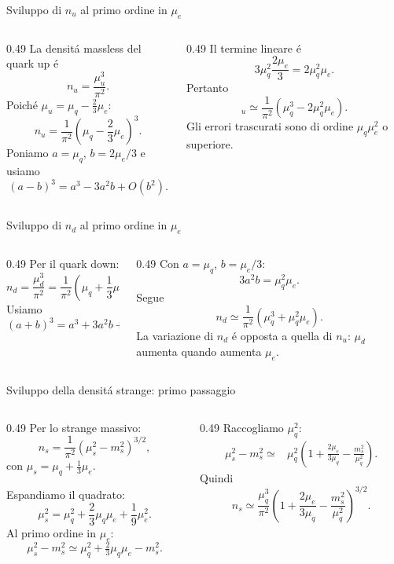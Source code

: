 \begin{frame}[t]{Sviluppo di $n_u$ al primo ordine in $\mu_e$}
\small
\begin{columns}[T,onlytextwidth]
\begin{column}{0.49\textwidth}
La densit\'a massless del quark up \'e
\[
n_u=\frac{\mu_u^3}{\pi^2}.
\]
Poich\'e $\mu_u=\mu_q-\frac23\mu_e$:
\[
 n_u=\frac1{\pi^2}
\left(\mu_q-\frac23\mu_e\right)^3.
\]
Poniamo $a=\mu_q$, $b=2\mu_e/3$ e usiamo
\[
(a-b)^3=a^3-3a^2b+O(b^2).
\]
\end{column}
\begin{column}{0.49\textwidth}
Il termine lineare \'e
\[
3\mu_q^2\frac{2\mu_e}{3}
=2\mu_q^2\mu_e.
\]
Pertanto
\[
\boxed{
_u\simeq\frac1{\pi^2}
\left(\mu_q^3-2\mu_q^2\mu_e\right)}.
\]
Gli errori trascurati sono di ordine $\mu_q\mu_e^2$ o superiore.
\end{column}
\end{columns}
\end{frame}

\begin{frame}[t]{Sviluppo di $n_d$ al primo ordine in $\mu_e$}
\small
\begin{columns}[T,onlytextwidth]
\begin{column}{0.49\textwidth}
Per il quark down:
\[
n_d=\frac{\mu_d^3}{\pi^2}
=\frac1{\pi^2}
\left(\mu_q+\frac13\mu_e\right)^3.
\]
Usiamo
\[
(a+b)^3=a^3+3a^2b+O(b^2).
\]
\end{column}
\begin{column}{0.49\textwidth}
Con $a=\mu_q$, $b=\mu_e/3$:
\[
3a^2b=\mu_q^2\mu_e.
\]
Segue
\[
\boxed{
n_d\simeq\frac1{\pi^2}
\left(\mu_q^3+\mu_q^2\mu_e\right)}.
\]
La variazione di $n_d$ \'e opposta a quella di $n_u$: $\mu_d$ aumenta quando aumenta $\mu_e$.
\end{column}
\end{columns}
\end{frame}

\begin{frame}[t]{Sviluppo della densit\'a strange: primo passaggio}
\small
\begin{columns}[T,onlytextwidth]
\begin{column}{0.49\textwidth}
Per lo strange massivo:
\[
n_s=\frac1{\pi^2}
(\mu_s^2-m_s^2)^{3/2},
\]
con $\mu_s=\mu_q+\frac13\mu_e$.

Espandiamo il quadrato:
\[
\mu_s^2=\mu_q^2+
\frac23\mu_q\mu_e+
\frac19\mu_e^2.
\]
Al primo ordine in $\mu_e$:
\[
\mu_s^2-m_s^2\simeq
\mu_q^2+\tfrac23\mu_q\mu_e-m_s^2.
\]
\end{column}
\begin{column}{0.49\textwidth}
Raccogliamo $\mu_q^2$:
\[
\begin{aligned}
\mu_s^2-m_s^2\simeq{}&\mu_q^2
\left(1+\frac{2\mu_e}{3\mu_q}
-\frac{m_s^2}{\mu_q^2}\right).
\end{aligned}
\]
Quindi
\[
 n_s\simeq\frac{\mu_q^3}{\pi^2}
\left(1+\frac{2\mu_e}{3\mu_q}
-\frac{m_s^2}{\mu_q^2}\right)^{3/2}.
\]
\end{column}
\end{columns}
\end{frame}

